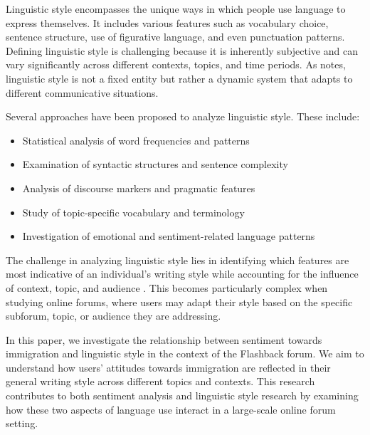 \documentclass[11pt]{article}
\begin{document}
Linguistic style encompasses the unique ways in which people use language to express themselves.
It includes various features such as vocabulary choice, sentence structure, use of figurative language, and even punctuation patterns.
Defining linguistic style is challenging because it is inherently subjective and can vary significantly across different contexts, topics, and time periods.
As \citet{Biber1988} notes, linguistic style is not a fixed entity but rather a dynamic system that adapts to different communicative situations.

Several approaches have been proposed to analyze linguistic style. These include:
\begin{itemize}
        \item Statistical analysis of word frequencies and patterns
        \item Examination of syntactic structures and sentence complexity
        \item Analysis of discourse markers and pragmatic features
        \item Study of topic-specific vocabulary and terminology
        \item Investigation of emotional and sentiment-related language patterns
\end{itemize}

The challenge in analyzing linguistic style lies in identifying which features are most indicative of an individual's writing style while accounting for the influence of context, topic, and audience \citep{Schwartz2017,Pennebaker2000}.
This becomes particularly complex when studying online forums, where users may adapt their style based on the specific subforum, topic, or audience they are addressing.

In this paper, we investigate the relationship between sentiment towards immigration and linguistic style in the context of the Flashback forum.
We aim to understand how users' attitudes towards immigration are reflected in their general writing style across different topics and contexts.
This research contributes to both sentiment analysis and linguistic style research by examining how these two aspects of language use interact in a large-scale online forum setting.
\end{document}
